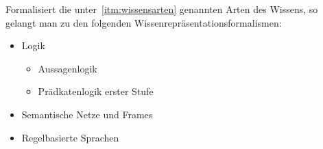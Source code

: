 \newpage

Formalisiert die unter~\ref{itm:wissensarten} genannten Arten des Wissens, so gelangt man zu den folgenden Wissenrepräsentationsformalismen:
\begin{itemize}
    \item Logik
        \begin{itemize}
            \item Aussagenlogik
            \item Prädkatenlogik erster Stufe
        \end{itemize}
    \item Semantische Netze und Frames
    \item Regelbasierte Sprachen
\end{itemize}

